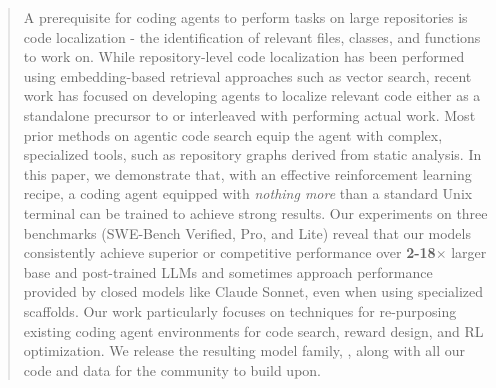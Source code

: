 \begin{abstract}
A prerequisite for coding agents to perform tasks on large repositories is code localization - the identification of relevant files, classes, and functions to work on. 
While repository-level code localization has been performed using embedding-based retrieval approaches such as vector search, recent work has focused on developing agents to localize relevant code either as a standalone precursor to or interleaved with performing actual work.
Most prior methods on agentic code search equip the agent with complex, specialized tools, such as repository graphs derived from static analysis.
In this paper, we demonstrate that, with an effective reinforcement learning recipe, a coding agent equipped with \emph{nothing more} than a standard Unix terminal can be trained to achieve strong results. Our experiments on three benchmarks (SWE-Bench Verified, Pro, and Lite) reveal that our models consistently achieve superior or competitive performance over \textbf{2-18$\times$} larger base and post-trained LLMs and sometimes approach performance provided by closed models like Claude Sonnet, even when using specialized scaffolds.
Our work particularly focuses on techniques for re-purposing existing coding agent environments for code search, reward design, and RL optimization. We release the resulting model family, \methodname, along with all our code and data for the community to build upon.
\end{abstract}